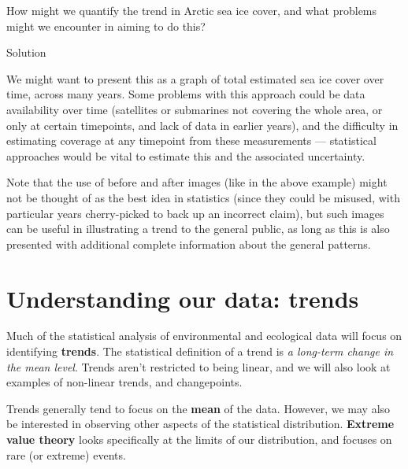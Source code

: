 \documentclass[
  letterpaper,
  DIV=11,
  numbers=noendperiod]{scrartcl}
\begin{document}
\begin{tcolorbox}[enhanced jigsaw, left=2mm, toprule=.15mm, rightrule=.15mm, coltitle=black, arc=.35mm, colframe=quarto-callout-tip-color-frame, breakable, bottomtitle=1mm, colback=white, titlerule=0mm, toptitle=1mm, title={Exercise 5}, bottomrule=.15mm, colbacktitle=quarto-callout-tip-color!10!white, opacitybacktitle=0.6, opacityback=0, leftrule=.75mm]

How might we quantify the trend in Arctic sea ice cover, and what
problems might we encounter in aiming to do this?

Solution

We might want to present this as a graph of total estimated sea ice
cover over time, across many years. Some problems with this approach
could be data availability over time (satellites or submarines not
covering the whole area, or only at certain timepoints, and lack of data
in earlier years), and the difficulty in estimating coverage at any
timepoint from these measurements --- statistical approaches would be
vital to estimate this and the associated uncertainty.

Note that the use of before and after images (like in the above example)
might not be thought of as the best idea in statistics (since they could
be misused, with particular years cherry-picked to back up an incorrect
claim), but such images can be useful in illustrating a trend to the
general public, as long as this is also presented with additional
complete information about the general patterns.

\end{tcolorbox}

\section{Understanding our data:
trends}\label{understanding-our-data-trends}

Much of the statistical analysis of environmental and ecological data
will focus on identifying \textbf{trends}. The statistical definition of
a trend is \emph{a long-term change in the mean level}. Trends aren't
restricted to being linear, and we will also look at examples of
non-linear trends, and changepoints.

Trends generally tend to focus on the \textbf{mean} of the data.
However, we may also be interested in observing other aspects of the
statistical distribution. \textbf{Extreme value theory} looks
specifically at the limits of our distribution, and focuses on rare (or
extreme) events.
\end{document}
